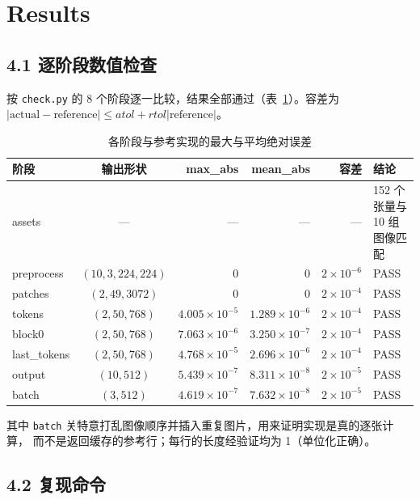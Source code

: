 \documentclass[a4paper,12pt]{article}
\begin{document}
\section{Results}

\subsection*{4.1 逐阶段数值检查}

按 \texttt{check.py} 的 8 个阶段逐一比较，结果全部通过（表~\ref{tab:err}）。容差为
$\lvert \text{actual}-\text{reference}\rvert \le atol + rtol\lvert\text{reference}\rvert$。

\begin{table}[H]
\centering\small
\caption{各阶段与参考实现的最大与平均绝对误差}
\label{tab:err}
\begin{tabular}{@{}lcrrrl@{}}
\hline
阶段 & 输出形状 & max\_abs & mean\_abs & 容差 & 结论 \\
\hline
assets      & —              & —          & —          & —      & 152 个张量与 10 组图像匹配 \\
preprocess  & $(10,3,224,224)$ & 0          & 0          & $2\times10^{-6}$ & PASS \\
patches     & $(2,49,3072)$  & 0          & 0          & $2\times10^{-4}$ & PASS \\
tokens      & $(2,50,768)$   & $4.005\times10^{-5}$ & $1.289\times10^{-6}$ & $2\times10^{-4}$ & PASS \\
block0      & $(2,50,768)$   & $7.063\times10^{-6}$ & $3.250\times10^{-7}$ & $2\times10^{-4}$ & PASS \\
last\_tokens & $(2,50,768)$  & $4.768\times10^{-5}$ & $2.696\times10^{-6}$ & $2\times10^{-4}$ & PASS \\
output      & $(10,512)$     & $5.439\times10^{-7}$ & $8.311\times10^{-8}$ & $2\times10^{-5}$ & PASS \\
batch       & $(3,512)$      & $4.619\times10^{-7}$ & $7.632\times10^{-8}$ & $2\times10^{-5}$ & PASS \\
\hline
\end{tabular}
\end{table}

其中 \texttt{batch} 关特意打乱图像顺序并插入重复图片，用来证明实现是真的逐张计算，
而不是返回缓存的参考行；每行的长度经验证均为 1（单位化正确）。

\subsection*{4.2 复现命令}
\end{document}
